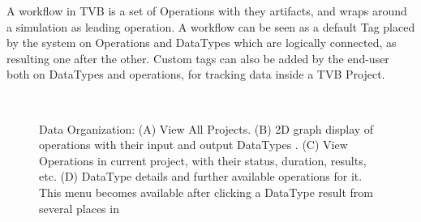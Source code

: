 A workflow in TVB is a set of Operations with they artifacts, and wraps around a simulation as leading operation.
A workflow can be seen as a default Tag placed by the system on Operations and DataTypes which are logically connected, as resulting one after the other.
Custom tags can also be added by the end-user both on DataTypes and operations, for tracking data inside a TVB Project.
	
 \begin{figure}
 	\centering
	\\
	\caption{\TVB Data Organization: 
	(A) View All Projects.
	(B) 2D graph display of operations with their input and output DataTypes .
	(C) View Operations in current project, with their status, duration, results, etc.
	(D) DataType details and further available operations for it. This menu becomes available after clicking a DataType result from several places in \TVB }
        \label{fig:project}
\end{figure}

